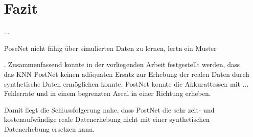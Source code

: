 
\section{Fazit}
\label{sec:kapitel_6}
...




PoseNet nicht fähig über simulierten Daten zu lernen, lertn ein Muster


.
Zusammenfassend konnte in der vorliegenden Arbeit festgestellt werden, dass das KNN PostNet keinen adäquaten Ersatz zur Erhebung der realen Daten durch synthetische Daten ermöglichen konnte. PostNet konnte die Akkurattessen mit ... Fehlerrate und in einem begrenzten Areal in einer Richtung erheben.

Damit liegt die Schlussfolgerung nahe, dass PostNet die sehr zeit- und kostenaufwändige reale Datenerhebung nicht mit einer synthetischen Datenerhebung ersetzen kann.
